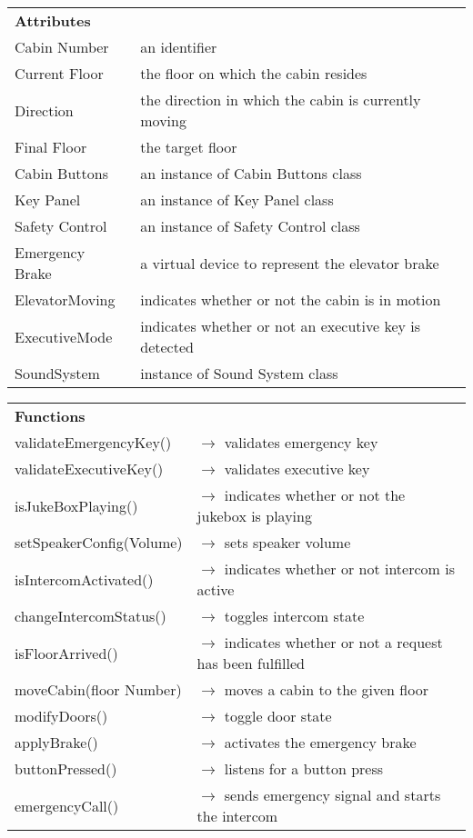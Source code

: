 \documentclass[12pt]{article}
\begin{document}
	\begin{table}[H]
        \begin{tabular}{lp{12cm}}
        	\textbf{Attributes} & \\
        	Cabin Number    	& an identifier \\
		    Current Floor     	& the floor on which the cabin resides \\
		    Direction           & the direction in which the cabin is currently moving\\
		    Final Floor     	& the target floor\\
		    Cabin Buttons     	& an instance of Cabin Buttons class\\
		    Key Panel           & an instance of Key Panel class\\
		    Safety Control    	& an instance of Safety Control class\\
		    Emergency Brake 	& a virtual device to represent the elevator brake\\
		    ElevatorMoving    	& indicates whether or not the cabin is in motion \\
		    ExecutiveMode    	& indicates whether or not an executive key is detected \\
		    SoundSystem         & instance of Sound System class \\
	    \end{tabular}
	\end{table}
	\begin{table}[H] 
	    \begin{tabular}{lp{12cm}}
	    	\textbf{Functions}       & \\
			validateEmergencyKey()   & $\rightarrow$ validates emergency key\\
		    validateExecutiveKey()   & $\rightarrow$ validates executive key\\
		    isJukeBoxPlaying()       & $\rightarrow$ indicates whether or not the jukebox is playing\\
		    setSpeakerConfig(Volume) & $\rightarrow$ sets speaker volume\\
		    isIntercomActivated()    & $\rightarrow$ indicates whether or not intercom is active\\
		    changeIntercomStatus()   & $\rightarrow$ toggles intercom state\\
		    isFloorArrived()         & $\rightarrow$ indicates whether or not a request has been fulfilled\\
		    moveCabin(floor Number)  & $\rightarrow$ moves a cabin to the given floor\\
		    modifyDoors()            & $\rightarrow$ toggle door state\\
		    applyBrake()             & $\rightarrow$ activates the emergency brake\\
		    buttonPressed()          & $\rightarrow$ listens for a button press\\
		    emergencyCall()          & $\rightarrow$ sends emergency signal and starts the intercom\\
	    \end{tabular}
	\end{table}
\end{document}
